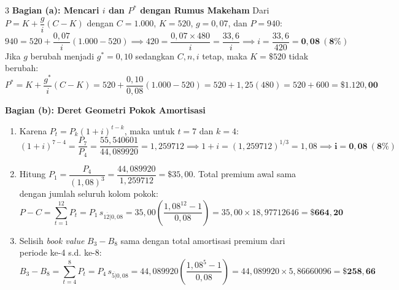 \documentclass[11pt,a4paper]{article}
\newcommand{\angl}[1]{\overline{#1|}}
\begin{document}
\begin{solusibox}{3}
\textbf{Bagian (a): Mencari $i$ dan $P^*$ dengan Rumus Makeham}
Dari $P = K + \dfrac{g}{i}(C - K)$ dengan $C = 1.000$, $K = 520$, $g = 0{,}07$, dan $P = 940$:
\[
    940 = 520 + \frac{0{,}07}{i}(1.000 - 520) \implies 420 = \frac{0{,}07 \times 480}{i} = \frac{33{,}6}{i} \implies i = \frac{33{,}6}{420} = \mathbf{0{,}08 \ (8\%)}
\]
Jika $g$ berubah menjadi $g^* = 0{,}10$ sedangkan $C, n, i$ tetap, maka $K = \$520$ tidak berubah:
\[
    P^* = K + \frac{g^*}{i}(C - K) = 520 + \frac{0{,}10}{0{,}08}(1.000 - 520) = 520 + 1{,}25(480) = 520 + 600 = \mathbf{\$1.120{,}00}
\]

\textbf{Bagian (b): Deret Geometri Pokok Amortisasi}
\begin{enumerate}[label=(\roman*), leftmargin=6mm, topsep=1pt, itemsep=1pt]
    \item Karena $P_t = P_k(1+i)^{t-k}$, maka untuk $t=7$ dan $k=4$:
    \[
        (1+i)^{7-4} = \frac{P_7}{P_4} = \frac{55{,}540601}{44{,}089920} = 1{,}259712 \implies 1+i = (1{,}259712)^{1/3} = 1{,}08 \implies \mathbf{i = 0{,}08 \ (8\%)}
    \]
    \item Hitung $P_1 = \dfrac{P_4}{(1{,}08)^3} = \dfrac{44{,}089920}{1{,}259712} = \$35{,}00$. Total premium awal sama dengan jumlah seluruh kolom pokok:
    \[
        P - C = \sum_{t=1}^{12} P_t = P_1 \, s_{\angl{12}0{,}08} = 35{,}00 \left(\frac{1{,}08^{12} - 1}{0{,}08}\right) = 35{,}00 \times 18{,}97712646 = \mathbf{\$664{,}20}
    \]
    \item Selisih \textit{book value} $B_3 - B_8$ sama dengan total amortisasi premium dari periode ke-4 s.d. ke-8:
    \[
        B_3 - B_8 = \sum_{t=4}^{8} P_t = P_4 \, s_{\angl{5}0{,}08} = 44{,}089920 \left(\frac{1{,}08^5 - 1}{0{,}08}\right) = 44{,}089920 \times 5{,}86660096 = \mathbf{\$258{,}66}
    \]
\end{enumerate}
\end{solusibox}
\end{document}
